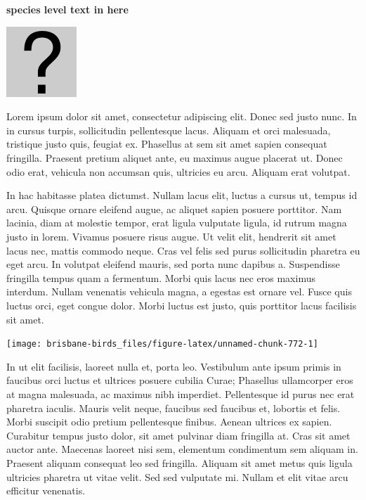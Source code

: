 \documentclass[]{book}
\let\origfigure\figure
\let\endorigfigure\endfigure
\renewenvironment{figure}[1][2] {
  \expandafter\origfigure\expandafter[H]
} {
  \endorigfigure
}
\begin{document}
\textbf{species level text in here}

\begin{figure}
\centering
\includegraphics{assets/missing.png}
\caption{No image for species}
\end{figure}

Lorem ipsum dolor sit amet, consectetur adipiscing elit. Donec sed justo
nunc. In in cursus turpis, sollicitudin pellentesque lacus. Aliquam et
orci malesuada, tristique justo quis, feugiat ex. Phasellus at sem sit
amet sapien consequat fringilla. Praesent pretium aliquet ante, eu
maximus augue placerat ut. Donec odio erat, vehicula non accumsan quis,
ultricies eu arcu. Aliquam erat volutpat.

In hac habitasse platea dictumst. Nullam lacus elit, luctus a cursus ut,
tempus id arcu. Quisque ornare eleifend augue, ac aliquet sapien posuere
porttitor. Nam lacinia, diam at molestie tempor, erat ligula vulputate
ligula, id rutrum magna justo in lorem. Vivamus posuere risus augue. Ut
velit elit, hendrerit sit amet lacus nec, mattis commodo neque. Cras vel
felis sed purus sollicitudin pharetra eu eget arcu. In volutpat eleifend
mauris, sed porta nunc dapibus a. Suspendisse fringilla tempus quam a
fermentum. Morbi quis lacus nec eros maximus interdum. Nullam venenatis
vehicula magna, a egestas est ornare vel. Fusce quis luctus orci, eget
congue dolor. Morbi luctus est justo, quis porttitor lacus facilisis sit
amet.

\begin{figure}
\texttt{[image: brisbane-birds\_files/figure-latex/unnamed-chunk-772-1]} \caption{insert figure caption}\label{fig:unnamed-chunk-772}
\end{figure}

In ut elit facilisis, laoreet nulla et, porta leo. Vestibulum ante ipsum
primis in faucibus orci luctus et ultrices posuere cubilia Curae;
Phasellus ullamcorper eros at magna malesuada, ac maximus nibh
imperdiet. Pellentesque id purus nec erat pharetra iaculis. Mauris velit
neque, faucibus sed faucibus et, lobortis et felis. Morbi suscipit odio
pretium pellentesque finibus. Aenean ultrices ex sapien. Curabitur
tempus justo dolor, sit amet pulvinar diam fringilla at. Cras sit amet
auctor ante. Maecenas laoreet nisi sem, elementum condimentum sem
aliquam in. Praesent aliquam consequat leo sed fringilla. Aliquam sit
amet metus quis ligula ultricies pharetra ut vitae velit. Sed sed
vulputate mi. Nullam et elit vitae arcu efficitur venenatis.
\end{document}
